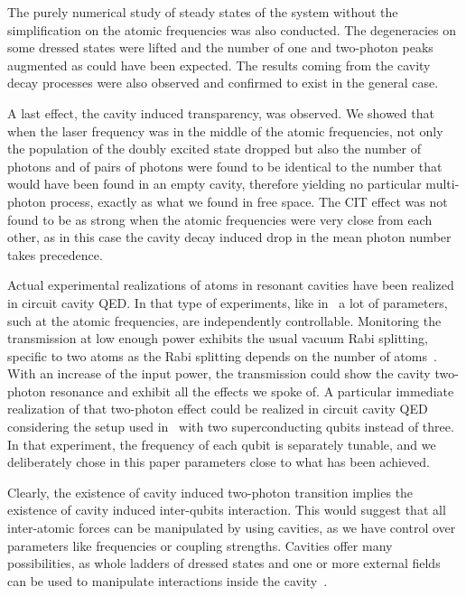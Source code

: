 The purely numerical study of steady states of the system without the simplification on the atomic frequencies was also conducted. The degeneracies on some dressed states were lifted and the number of one and two-photon peaks augmented as could have been expected. The results coming from the cavity decay processes were also observed and confirmed to exist in the general case.

A last effect, the cavity induced transparency, was observed. We showed that when the laser frequency was in the middle of the atomic frequencies, not only the population of the doubly excited state dropped but also the number of photons and of pairs of photons were found to be identical to the number that would have been found in an empty cavity, therefore yielding no particular multi-photon process, exactly as what we found in free space. The CIT effect was not found to be as strong when the atomic frequencies were very close from each other, as in this case the cavity decay induced drop in the mean photon number takes precedence.

Actual experimental realizations of atoms in resonant cavities have been realized in circuit cavity QED. In that type of experiments, like in~\cite{Fin08, Fin09,Bau09} a lot of parameters, such at the atomic frequencies, are independently controllable. Monitoring the transmission at low enough power exhibits the usual vacuum Rabi splitting, specific to two atoms as the Rabi splitting depends on the number of atoms~\cite{San83, Aga84, Rai89, Boc04, Mau05, tho98}. With an increase of the input power, the transmission could show the cavity two-photon resonance and exhibit all the effects we spoke of. A particular immediate realization of that two-photon effect could be realized in circuit cavity QED considering the setup used in~\cite{Fin09} with two superconducting qubits instead of three. In that experiment, the frequency of each qubit is separately tunable, and we deliberately chose in this paper parameters close to what has been achieved.

Clearly, the existence of cavity induced two-photon transition implies the existence of cavity induced inter-qubits interaction. This would suggest that all inter-atomic forces can be manipulated by using cavities, as we have control over parameters like frequencies or coupling strengths. Cavities offer many possibilities, as whole ladders of dressed states and one or more external fields can be used to manipulate interactions inside the cavity~\cite{sol03, Bir05}.

